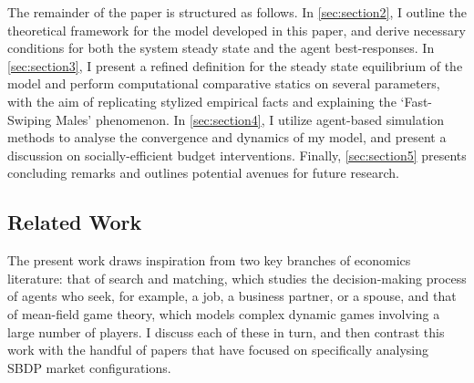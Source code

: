 The remainder of the paper is structured as follows. In \autoref{sec:section2}, I outline the theoretical framework for the model developed in this paper, and derive necessary conditions for both the system steady state and the agent best-responses. In \autoref{sec:section3}, I present a refined definition for the steady state equilibrium of the model and perform computational comparative statics on several parameters, with the aim of replicating stylized empirical facts and explaining the `Fast-Swiping Males' phenomenon. In \autoref{sec:section4}, I utilize agent-based simulation methods to analyse the convergence and dynamics of my model, and present a discussion on socially-efficient budget interventions. Finally, \autoref{sec:section5} presents concluding remarks and outlines potential avenues for future research.

\subsection{Related Work}
The present work draws inspiration from two key branches of economics literature: that of search and matching, which studies the decision-making process of agents who seek, for example, a job, a business partner, or a spouse, and that of mean-field game theory, which models complex dynamic games involving a large number of players. 
I discuss each of these in turn, and then contrast this work with the handful of papers that have focused on specifically analysing SBDP market configurations.


